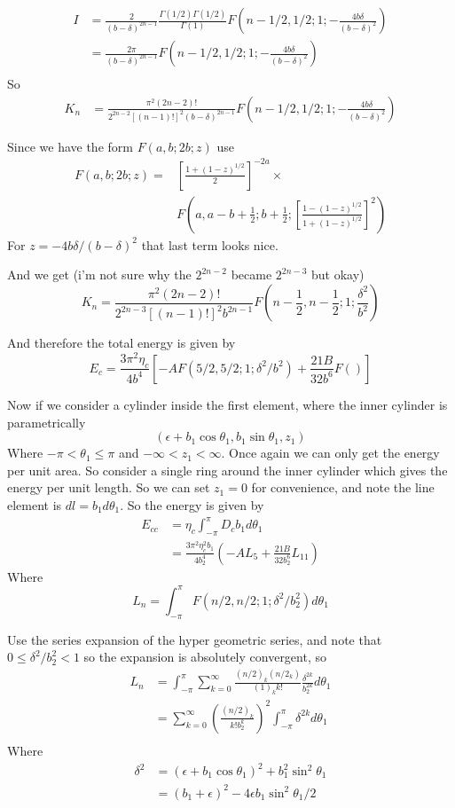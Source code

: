 \documentclass{X:/Documents/Coding/Latex/myassignment}
\begin{document}
\begin{align*}
	I &= \frac{2}{(b- \delta)^{2n-1}} \frac{\Gamma(1/2) \Gamma(1/2)}{\Gamma(1)} F(n-1/2,1/2;1;-\frac{4b \delta}{(b- \delta)^2})\\
	&= \frac{2\pi}{(b- \delta)^{2n-1}} F(n-1/2,1/2;1;-\frac{4b \delta}{(b- \delta)^2})\\
\end{align*}
So
\begin{align*}
	K_n &= \frac{\pi^2 (2n-2)!}{2^{2n-2} [(n-1)!]^2 (b- \delta)^{2n-1}} F(n-1/2,1/2;1; - \frac{4 b \delta}{(b - \delta)^2})
\end{align*}

Since we have the form $F(a,b;2b;z)$ use
\begin{align*}
	F(a,b;2b;z) = &\left[\frac{1 + (1-z)^{1/2}}2\right]^{-2a} \times \\
	&F\left(a,a-b+\frac12; b+\frac12; \left[\frac{1- (1-z)^{1/2}}{1+(1-z)^{1/2}}\right]^2 \right)	
\end{align*}
For $z = -4 b \delta/(b- \delta)^2$ that last term looks nice.


And we get (i'm not sure why the $2^{2n-2}$ became $2^{2n-3}$ but okay)
\[K_n = \frac{\pi^2(2n-2)!}{2^{2n-3}[(n-1)!]^{2} b^{2n-1}} F(n-\frac12, n - \frac12 ; 1 ; \frac{\delta^2}{b^2})\]

And therefore the total energy is given by
\[E_c = \frac{3\pi^2 \eta_c}{4b^4} \left[-AF(5/2,5/2;1;\delta^2/b^2) + \frac{21B}{32 b^6} F()\right]\]

Now if we consider a cylinder inside the first element, where the inner cylinder is parametrically
\[(\epsilon + b_1\cos\theta_1, b_1\sin\theta_1, z_1)\]
Where $-\pi < \theta_1 \leq \pi$ and $-\infty < z_1 < \infty$.
Once again we can only get the energy per unit area. So consider a single ring around the inner cylinder which gives the energy per unit length. So we can set $z_1 =0$ for convenience, and note the line element is $d l = b_1 d\theta_1$. So the energy is given by
\begin{align*}
	E_{cc} &= \eta_c \int_{-\pi}^{\pi} D_c b_1 d\theta_1\\
	&= \frac{3\pi^2\eta_c^2b_1}{4b_2^4} \left(-AL_5 + \frac{21B}{32b_2^6} L_{11}\right)
\end{align*}
Where
\[L_n = \int_{-\pi}^{\pi} F\left(n/2,n/2;1; \delta^2/b_2^2\right) d\theta_1\]

Use the series expansion of the hyper geometric series, and note that $0\leq \delta^2/b_2^2 < 1$ so the expansion is absolutely convergent, so
\begin{align*}
	L_n &= \int_{-\pi}^{\pi} \sum_{k=0}^\infty \frac{(n/2)_k (n/2_k)}{(1)_k k!} \frac{\delta^{2k}}{b_2^{2k}} d\theta_1\\
	&=\sum_{k=0}^\infty \left(\frac{(n/2)_k}{k! b_2^{k}}\right)^2 \int_{-\pi}^{\pi}\delta^{2k} d\theta_1\\
\end{align*}
Where
\begin{align*}
	\delta^2 &= (\epsilon + b_1 \cos\theta_1)^2 + b_1^2 \sin^2\theta_1\\
	&=(b_1 + \epsilon)^2 - 4 \epsilon b_1 \sin^2 \theta_1/2
\end{align*}
\end{document}
